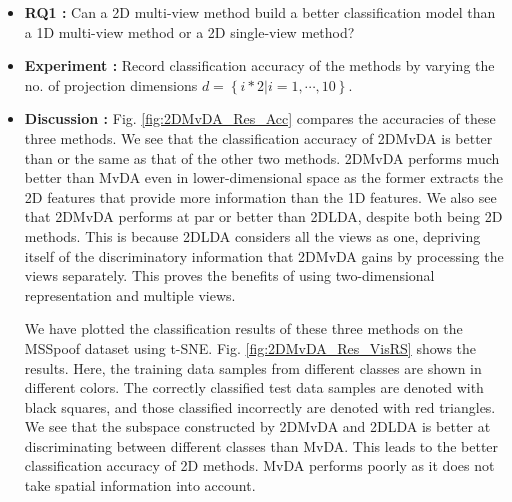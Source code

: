 \begin{itemize}
\item \textbf{RQ1 :}
Can a 2D multi-view method build a better classification model than a 1D multi-view method or a 2D single-view method?

\item \textbf{Experiment :}
Record classification accuracy of the methods by varying the no. of projection dimensions $d = \left \{ i*2|i=1, \cdots, 10 \right \}$.

\item \textbf{Discussion :}
Fig. \ref{fig:2DMvDA_Res_Acc} compares the accuracies of these three methods. We see that the classification accuracy of 2DMvDA is better than or the same as that of the other two methods. 2DMvDA performs much better than MvDA even in lower-dimensional space as the former extracts the 2D features that provide more information than the 1D features. We also see that 2DMvDA performs at par or better than 2DLDA, despite both being 2D methods. This is because 2DLDA considers all the views as one, depriving itself of the discriminatory information that 2DMvDA gains by processing the views separately. This proves the benefits of using two-dimensional representation and multiple views.

We have plotted the classification results of these three methods on the MSSpoof dataset using t-SNE. Fig. \ref{fig:2DMvDA_Res_VisRS} shows the results. Here, the training data samples from different classes are shown in different colors. The correctly classified test data samples are denoted with black squares, and those classified incorrectly are denoted with red triangles. We see that the subspace constructed by 2DMvDA and 2DLDA is better at discriminating between different classes than MvDA. This leads to the better classification accuracy of 2D methods. MvDA performs poorly as it does not take spatial information into account.
\end{itemize}

